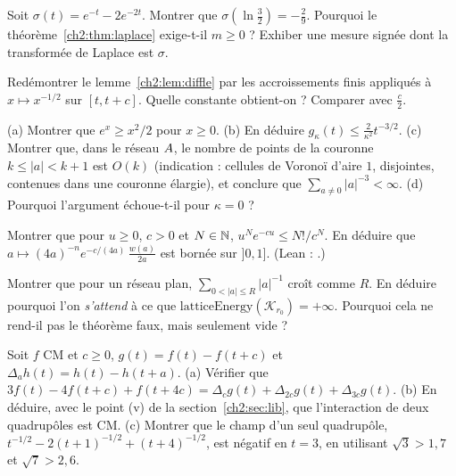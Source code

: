 \begin{exercise}\label{ch2:ex:signedmix}
Soit $\sigma(t)=e^{-t}-2e^{-2t}$. Montrer que $\sigma(\ln\frac32)=-\frac29$. Pourquoi le théorème~\ref{ch2:thm:laplace}
exige-t-il $m\ge0$ ? Exhiber une mesure signée dont la transformée de Laplace est $\sigma$.
\end{exercise}

\begin{exercise}\label{ch2:ex:diffle}
Redémontrer le lemme~\ref{ch2:lem:diffle} par les accroissements finis appliqués à $x\mapsto x^{-1/2}$ sur $[t,t+c]$.
Quelle constante obtient-on ? Comparer avec $\frac c2$.
\end{exercise}

\begin{exercise}
(a) Montrer que $e^x\ge x^2/2$ pour $x\ge0$. (b) En déduire $g_\kappa(t)\le\frac2{\kappa^2}t^{-3/2}$. (c) Montrer que,
dans le réseau $A$, le nombre de points de la couronne $k\le|a|<k+1$ est $O(k)$ (indication : cellules de Voronoï
d'aire $1$, disjointes, contenues dans une couronne élargie), et conclure que $\sum_{a\ne0}|a|^{-3}<\infty$.
(d) Pourquoi l'argument échoue-t-il pour $\kappa=0$ ?
\end{exercise}

\begin{exercise}
Montrer que pour $u\ge0$, $c>0$ et $N\in\mathbb{N}$, $u^Ne^{-cu}\le N!/c^N$. En déduire que
$a\mapsto(4a)^{-n}e^{-c/(4a)}\,\frac{w(a)}{2a}$ est bornée sur $]0,1]$. (Lean : .)
\end{exercise}

\begin{exercise}
Montrer que pour un réseau plan, $\sum_{0<|a|\le R}|a|^{-1}$ croît comme $R$. En déduire pourquoi l'on
\emph{s'attend} à ce que $\mathrm{latticeEnergy}(\mathcal K_{r_0})=+\infty$. Pourquoi cela ne rend-il pas le théorème
 faux, mais seulement vide ?
\end{exercise}

\begin{exercise}[quadrupôles]\label{ch2:ex:quad}
Soit $f$ CM et $c\ge0$, $g(t)=f(t)-f(t+c)$ et $\Delta_ah(t)=h(t)-h(t+a)$. (a) Vérifier que
$3f(t)-4f(t+c)+f(t+4c)=\Delta_cg(t)+\Delta_{2c}g(t)+\Delta_{3c}g(t)$. (b) En déduire, avec le point (v) de la
section~\ref{ch2:sec:lib}, que l'interaction de deux quadrupôles est CM. (c) Montrer que le champ d'un seul quadrupôle,
$t^{-1/2}-2(t+1)^{-1/2}+(t+4)^{-1/2}$, est négatif en $t=3$, en utilisant $\sqrt3>1{,}7$ et $\sqrt7>2{,}6$.
\end{exercise}


